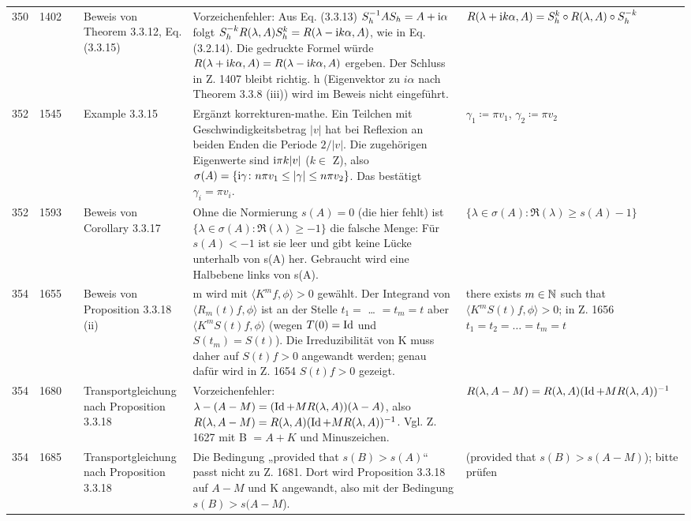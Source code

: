 \documentclass[10pt]{article}
\begin{document}
\begin{longtable}{@{}rrc>{\RaggedRight\arraybackslash}p{3.0cm}>{\RaggedRight\arraybackslash}p{11.4cm}>{\RaggedRight\arraybackslash}p{7.4cm}@{}}
350 & 1402 & \sichA{} & Beweis von Theorem 3.3.12, Eq. (3.3.15) & Vorzeichenfehler: Aus Eq. (3.3.13) $S_{h}^{-1}AS_{h} = A+\mathrm{i}\alpha$ folgt $S_{h}^{-k}R(\lambda,A)S_{h}^{k} = R(\lambda-\mathrm{i} k\alpha,A)$, wie in Eq. (3.2.14). Die gedruckte Formel würde $R(\lambda+\mathrm{i} k\alpha,A) = R(\lambda-\mathrm{i} k\alpha,A)$ ergeben. Der Schluss in Z. 1407 bleibt richtig. h (Eigenvektor zu $i\ensuremath{\alpha}$ nach Theorem 3.3.8 (iii)) wird im Beweis nicht eingeführt. & $R(\lambda+\mathrm{i} k\alpha,A) = S_{h}^{k}\circ R(\lambda,A)\circ S_{h}^{-k}$ \\[2pt]
352 & 1545 & \sichB{} & Example 3.3.15 & Ergänzt korrekturen-mathe. Ein Teilchen mit Geschwindigkeitsbetrag $\vert v\vert$ hat bei Reflexion an beiden Enden die Periode $2/\vert v\vert$. Die zugehörigen Eigenwerte sind $\mathrm{i}\pi k\vert v\vert$ ($k \ensuremath{\in}$ Z), also $\sigma(A) = \{\im\gamma \colon n\pi v_{1} \leq \vert\gamma\vert \leq n\pi v_{2}\}$. Das bestätigt $\ensuremath{\gamma}_i = \ensuremath{\pi} v_i$. & $\gamma_{1} \coloneq \pi v_{1}$, $\gamma_{2} \coloneq \pi v_{2}$ \\[2pt]
352 & 1593 & \sichC{} & Beweis von Corollary 3.3.17 & Ohne die Normierung $s(A) = 0$ (die hier fehlt) ist $\{\lambda \in \sigma(A) \colon \Re(\lambda) \geq -1\}$ die falsche Menge: Für $s(A) < -1$ ist sie leer und gibt keine Lücke unterhalb von s(A) her. Gebraucht wird eine Halbebene links von s(A). & $\{\lambda \in \sigma(A) \colon \Re(\lambda) \geq s(A)-1\}$ \\[2pt]
354 & 1655 & \sichA{} & Beweis von Proposition 3.3.18 (ii) & m wird mit $\langle K^{m}f,\phi\rangle > 0$ gewählt. Der Integrand von $\langle R_{m}(t)f,\phi\rangle$ ist an der Stelle $t_1 =$ \dots{} $= t_m = t$ aber $\langle K^{m}S(t)f,\phi\rangle$ (wegen $T(0) = \operatorname{Id} $ und $S(t_m) = S(t)$). Die Irreduzibilität von K muss daher auf $S(t)f > 0$ angewandt werden; genau dafür wird in Z. 1654 $S(t)f > 0$ gezeigt. & {there exists $m \in \mathbb{N}$ such that $\langle K^{m}S(t)f,\phi\rangle > 0$}; in Z. 1656 $t_{1}=t_{2}=\ldots=t_{m}=t$ \\[2pt]
354 & 1680 & \sichA{} & Transportgleichung nach Proposition 3.3.18 & Vorzeichenfehler: $\lambda-(A-M) = (\operatorname{Id} + MR(\lambda,A))(\lambda-A)$, also $R(\lambda,A-M) = R(\lambda,A)(\operatorname{Id} + MR(\lambda,A))^{-1}$. Vgl. Z. 1627 mit B $= A + K$ und Minuszeichen. & $R(\lambda,A-M) = R(\lambda,A)(\operatorname{Id} + MR(\lambda,A))^{-1}$ \\[2pt]
354 & 1685 & \sichC{} & Transportgleichung nach Proposition 3.3.18 & Die Bedingung „provided that $s(B) > s(A)$“ passt nicht zu Z. 1681. Dort wird Proposition 3.3.18 auf $A \ensuremath{-} M$ und K angewandt, also mit der Bedingung $s(B) > s(A \ensuremath{-} M$). & {(provided that $s(B) > s(A-M)$)}; bitte prüfen \\[2pt]

\end{longtable}
\end{document}

